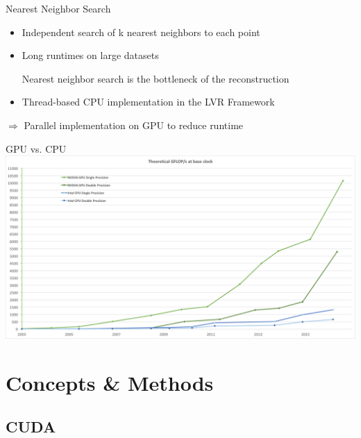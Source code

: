 \documentclass{beamer}
\begin{document}
\begin{frame}{Nearest Neighbor Search}
	\begin{itemize}
		\item Independent search of k nearest neighbors to each point
		\item Long runtimes on large datasets
		\begin{block}{}
			\centering Nearest neighbor search is the bottleneck of the reconstruction
		\end{block}
		\item Thread-based CPU implementation in the LVR Framework
	\end{itemize}
	\medskip
	\centering $\Rightarrow$ Parallel implementation on GPU to reduce runtime
\end{frame}

\begin{frame}{GPU vs. CPU}
	\includegraphics[width=1.0\textwidth]{gpu_comparison.png}
\end{frame}

\section{Concepts \& Methods}

\subsection*{CUDA}
\end{document}
